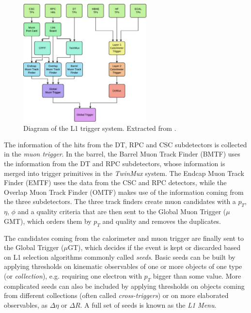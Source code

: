 \documentclass[../main.tex]{subfiles}
\begin{document}
\begin{figure}[h!]
\begin{center}
\includegraphics[width=0.6\textwidth]{Images/l1trigger}
\end{center}
\caption{Diagram of the L1 trigger system. Extracted from \cite{intro:l1_13tev}.}
\label{intro:exp:l1trigger_sketch}
\end{figure}



The information of the hits from the DT, RPC and CSC subdetectors is collected in the \textit{muon trigger}. In the barrel, the Barrel Muon Track Finder (BMTF) uses the information from the DT and RPC subdetectors, whose information is merged into trigger primitives in the \textit{TwinMux} system. The Endcap Muon Track Finder (EMTF) uses the data from the CSC and RPC detectors, while the Overlap Muon Track Finder (OMTF) makes use of the information coming from the three subdetectors. The three track finders create muon candidates with a $p_T$, $\eta$, $\phi$ and a quality criteria that are then sent to the Global Muon Trigger ($\mu$GMT), which orders them by $p_T$ and quality and removes the duplicates.

The candidates coming from the calorimeter and muon trigger are finally sent to the Global Trigger ($\mu$GT), which decides if the event is kept or discarded based on L1 selection algorithms commonly called \textit{seeds}. Basic seeds can be built by applying thresholds on kinematic observables of one or more objects of one type (or \textit{collection}), e.g. requiring one electron with $p_T$ bigger than some value. More complicated seeds can also be included by applying thresholds on objects coming from different collections (often called \textit{cross-triggers}) or on more elaborated observables, as $\Delta\eta$ or $\Delta R$. A full set of seeds is known as the \textit{L1 Menu}.
\end{document}

